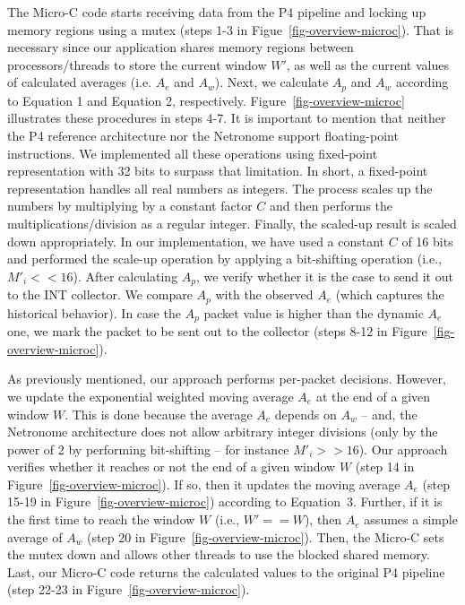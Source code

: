 %
The Micro-C code starts receiving data from the P4 pipeline and locking up memory regions using a mutex (steps 1-3 in Figue~\ref{fig-overview-microc}). That is necessary since our application shares memory regions between processors/threads to store the current window $W'$, as well as the current values of calculated averages (i.e. $A_e$ and $A_w$). 
%
Next, we calculate $A_p$  and $A_w$ according to Equation 1 and Equation 2, respectively. Figure~\ref{fig-overview-microc} illustrates these procedures in steps 4-7.  It is important to mention that neither the P4 reference architecture nor the Netronome support floating-point instructions. We implemented all these operations using fixed-point representation with 32 bits to surpass that limitation. In short, a fixed-point representation handles all real numbers as integers. The process scales up the numbers by multiplying by a constant factor $C$ and then performs the multiplications/division as a regular integer. Finally, the scaled-up result is scaled down appropriately. In our implementation, we have used a constant $C$ of 16 bits and performed the scale-up operation by applying a bit-shifting operation (i.e., $M'_i << 16$). After calculating $A_p$, we verify whether it is the case to send it out to the INT collector. We compare $A_p$ with the observed $A_e$ (which captures the historical behavior). In case the  $A_p$ packet value is higher than the dynamic $A_e$ one, we mark the packet to be sent out to the collector (steps 8-12 in Figure~\ref{fig-overview-microc}).


As previously mentioned, our approach performs per-packet decisions. However, we update the exponential weighted moving average $A_e$ at the end of a given window $W$. This is done because the average $A_e$ depends on $A_w$ -- and, the Netronome architecture does not allow arbitrary integer divisions (only by the power of 2 by performing bit-shifting -- for instance $M'_i >> 16$). Our approach verifies whether it reaches or not the end of a given window $W$ (step 14 in Figure~\ref{fig-overview-microc}). If so, then it updates the moving average $A_e$ (step 15-19 in Figure~\ref{fig-overview-microc}) according to Equation~3. Further, if it is the first time to reach the window $W$ (i.e., $W' == W$), then $A_e$ assumes a simple average of $A_w$ (step 20 in Figure~\ref{fig-overview-microc}). Then, the Micro-C sets the mutex down and allows other threads to use the blocked shared memory. Last, our Micro-C code returns the calculated values to the original P4 pipeline (step 22-23 in Figure~\ref{fig-overview-microc}). 


